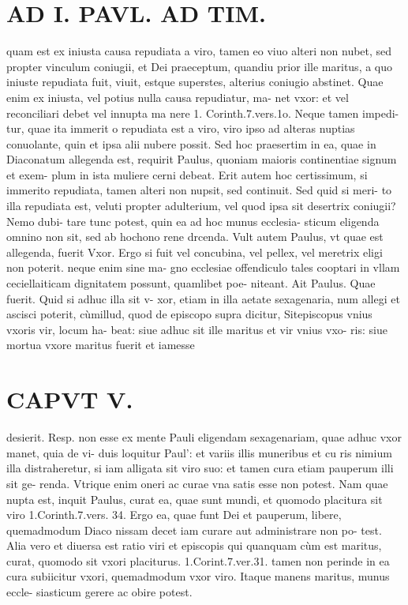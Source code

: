 \documentclass{article}
\begin{document}
\begin{pages}
\section*{AD I. PAVL. AD TIM. }
\marginpar{[ p.276 ]}\pstart quam est ex iniusta causa repudiata a viro, tamen eo viuo alteri non nubet, sed propter vinculum coniugii, et Dei praeceptum, quandiu prior ille maritus, a quo iniuste repudiata fuit, viuit, estque superstes, alterius coniugio abstinet. Quae enim ex iniusta, vel potius nulla causa repudiatur, ma- net vxor: et vel reconciliari debet vel innupta ma nere 1. Corinth.7.vers.1o. Neque tamen impedi- tur, quae ita immerit o repudiata est a viro, viro ipso ad alteras nuptias conuolante, quin et ipsa alii nubere possit. Sed hoc praesertim in ea, quae in Diaconatum allegenda est, requirit Paulus, quoniam maioris continentiae signum et exem- plum in ista muliere cerni debeat. Erit autem hoc certissimum, si immerito repudiata, tamen alteri non nupsit, sed continuit. Sed quid si meri- to illa repudiata est, veluti propter adulterium, vel quod ipsa sit desertrix coniugii? Nemo dubi- tare tunc potest, quin ea ad hoc munus ecclesia- sticum eligenda omnino non sit, sed ab hochono rene drcenda.  \pend\pstart Vult autem Paulus, vt quae est allegenda, fuerit Vxor. Ergo si fuit vel concubina, vel pellex, vel meretrix eligi non poterit. neque enim sine ma- gno ecclesiae offendiculo tales cooptari in vllam ceciellaiticam dignitatem possunt, quamlibet poe- niteant.  \pend\pstart Ait Paulus. Quae fuerit. Quid si adhuc illa sit v- xor, etiam in illa aetate sexagenaria, num allegi et ascisci poterit, cùmillud, quod de episcopo supra dicitur, Sitepiscopus vnius vxoris vir, locum ha- beat: siue adhuc sit ille maritus et vir vnius vxo- ris: siue mortua vxore maritus fuerit et iamesse  \pend
\section*{CAPVT  V. }
\marginpar{[ p.277 ]}\pstart desierit. Resp. non esse ex mente Pauli eligendam sexagenariam, quae adhuc vxor manet, quia de vi- duis loquitur Paul': et variis illis muneribus et cu ris nimium illa distraheretur, si iam alligata sit viro suo: et tamen cura etiam pauperum illi sit ge- renda. Vtrique enim oneri ac curae vna satis esse non potest. Nam quae nupta est, inquit Paulus, curat ea, quae sunt mundi, et quomodo placitura sit viro 1.Corinth.7.vers. 34. Ergo ea, quae funt Dei et pauperum, libere, quemadmodum Diaco nissam decet iam curare aut administrare non po- test. Alia vero et diuersa est ratio viri et episcopis qui quanquam cùm est maritus, curat, quomodo sit vxori placiturus. 1.Corint.7.ver.31. tamen non perinde in ea cura subiicitur vxori, quemadmodum vxor viro. Itaque manens maritus, munus eccle- siasticum gerere ac obire potest.  \pend
{}
{}

\end{pages}
\end{document}

